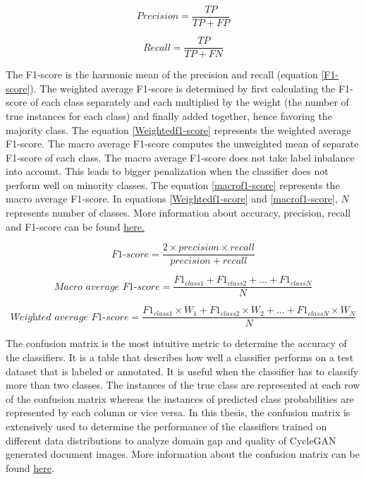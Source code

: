 \begin{equation}\label{precision}
\textit{Precision} = \frac{TP}{TP + FP}
\end{equation}

\begin{equation}\label{recall}
\textit{Recall} = \frac{TP}{TP + FN}
\end{equation}

\newpage
The F1-score is the harmonic mean of the precision and recall (equation \ref{F1-score}). The weighted average F1-score is determined by first calculating the F1-score of each class separately and each multiplied by the weight (the number of true instances for each class) and finally added together, hence favoring the majority class\footnotemark. The equation \ref{Weightedf1-score} represents the weighted average F1-score. The macro average F1-score computes the unweighted mean of separate F1-score of each class. The macro average F1-score does not take label inbalance into account\footnotemark[\value{footnote}]. This leads to bigger penalization when the classifier does not perform well on minority classes. The equation \ref{macrof1-score} represents the macro average F1-score. In equations \ref{Weightedf1-score} and \ref{macrof1-score}, $N$ represents number of classes. More information about accuracy, precision, recall and F1-score can be found \href{https://en.wikipedia.org/wiki/Precision_and_recall}{here.}



\begin{equation}\label{F1-score}
\textit{F1-score} = \frac{2 \times precision \times recall}{precision + recall}
\end{equation}


\begin{equation}\label{macrof1-score} 
\textit{Macro average F1-score} =  \frac{F1_{class1} + F1_{class2}+ ... + F1_{classN}}{N}
\end{equation}


\begin{equation}\label{Weightedf1-score} 
\textit{Weighted average F1-score} =  \frac{F1_{class1} \times W_1 + F1_{class2} \times W_2 + ... + F1_{classN} \times W_N}{N}
\end{equation}

The confusion matrix is the most intuitive metric to determine the accuracy of the classifiers. It is a table that describes how well a classifier performs on a test dataset that is labeled or annotated. It is useful when the classifier has to classify more than two classes. The instances of the true class are represented at each row of the confusion matrix whereas the instances of predicted class probabilities are represented by each column or vice versa. In this thesis, the confusion matrix is extensively used to determine the performance of the classifiers trained on different data distributions to analyze domain gap and quality of \ac{CycleGAN} generated document images. More information about the confusion matrix can be found \href{https://en.wikipedia.org/wiki/Confusion_matrix}{here}.

